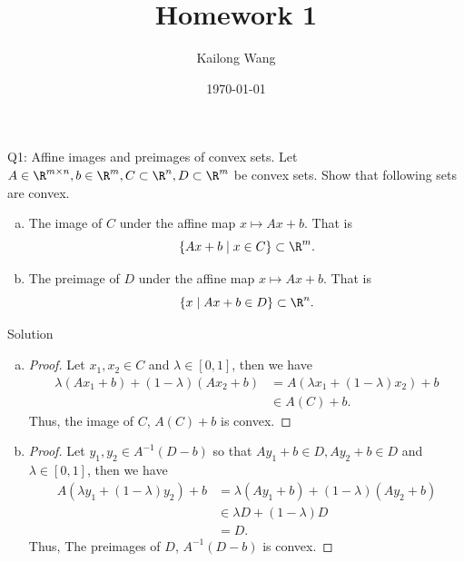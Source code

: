 \documentclass{article}
\title{Homework 1}
\author{Kailong Wang}
\date{\today}
\theoremstyle{plain}
\theoremstyle{definition}
\theoremstyle{remark}
\begin{document}
\maketitle
\begin{problem}
    {Q1: Affine images and preimages of convex sets.}
    Let $A\in \R^{m\times n}, b\in\R^m, C\subset\R^n, D\subset\R^m$ be convex sets. Show that following sets are convex.
    \begin{enumerate}[(a)]
        \item The image of $C$ under the affine map $x\mapsto Ax+b$. That is {
            \[
                \{Ax+b\mid x\in C\}\subset\R^m.
            \]
        }
        \item The preimage of $D$ under the affine map $x\mapsto Ax+b$. That is {
            \[
                \{x\mid Ax+b\in D\}\subset\R^n.
            \]
        }
    \end{enumerate}
\end{problem}

\begin{solution}
    {Solution}
    \begin{enumerate}[(a)]
        \item  {
            \begin{proof}
                Let $x_1,x_2\in C$ and $\lambda\in[0,1]$, then we have {
                \begin{align*}
                    \lambda(Ax_1+b)+(1-\lambda)(Ax_2+b) &= A(\lambda x_1+(1-\lambda)x_2)+b\\
                    &\in A(C)+b.
                \end{align*}
                }
            Thus, the image of $C$, $A(C)+b$ is convex.
            \end{proof}
        }
        \item {
            \begin{proof}
                Let $y_1,y_2\in A^{-1}(D-b)$ so that $Ay_1+b\in D, Ay_2+b\in D$ and $\lambda\in[0,1]$, then we have {
                \begin{align*}
                    A(\lambda y_1+(1-\lambda)y_2)+b &= \lambda(Ay_1+b)+(1-\lambda)(Ay_2+b)\\
                    &\in \lambda D+(1-\lambda)D\\
                    &= D.
                \end{align*}
            }
            Thus, The preimages of $D$, $A^{-1}(D-b)$ is convex.
            \end{proof}
        }
    \end{enumerate}
\end{solution}
\end{document}
